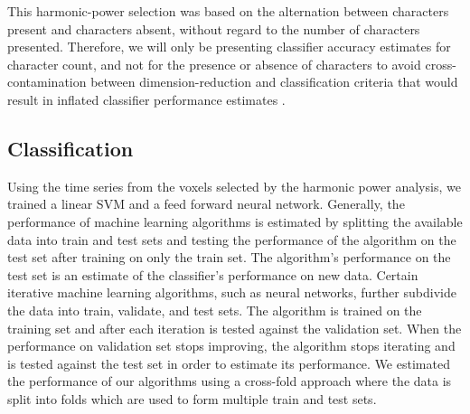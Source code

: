 \documentclass[preprint,5p,authoryear]{elsarticle}
\begin{document}
This harmonic-power selection was based on the alternation between characters present and characters absent, without regard to the number of characters presented. 
Therefore, we will only be presenting classifier accuracy estimates for character count, and not for the presence or absence of characters to avoid cross-contamination between dimension-reduction and  classification criteria that would result in inflated classifier performance estimates \citep{CrossContamination}.

\subsection{Classification}
Using the time series from the voxels selected by the harmonic power analysis, we trained a linear SVM and a feed forward neural network.
Generally, the performance of machine learning algorithms is estimated by splitting the available data into train and test sets and testing the performance of the algorithm on the test set after training on only the train set.
The algorithm's performance on the test set is an estimate of the classifier's performance on new data.
Certain iterative machine learning algorithms, such as neural networks, further subdivide the data into train, validate, and test sets.
The algorithm is trained on the training set and after each iteration is tested against the validation set.
When the performance on validation set stops improving, the algorithm stops iterating and is tested against the test set in order to estimate its performance.
We estimated the performance of our algorithms using a cross-fold approach \citep{Kohavi1995} where the data is split into folds which are used to form multiple train and test sets.
\end{document}
